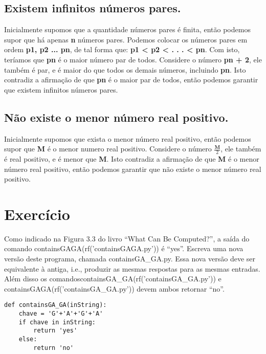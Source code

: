 \documentclass[12pt]{scrartcl}
\begin{document}
\subsection{ Existem infinitos números pares.}
Inicialmente supomos que a quantidade números pares é finita,
então podemos supor que há apenas \textbf{n} números pares.\newline
Podemos colocar os números pares em ordem \textbf{p1, p2 ... pn},
de tal forma que:\newline
\textbf{p1 < p2 < . . . < pn}. \newline
Com isto, teríamos que \textbf{pn} é o maior número par de todos.\newline
Considere o número \textbf{pn + 2}, ele também é par, e é
maior do que todos os demais números, incluindo \textbf{pn}. Isto contradiz a afirmação de que \textbf{pn}
 é o maior par de todos, então podemos garantir que existem infinitos números pares.
 
 
 \subsection{ Não existe o menor número real positivo.}
Inicialmente supomos que exista o menor número real positivo,
então podemos supor que  \textbf{M} é o menor numero real positivo.\newline
Considere o número $\displaystyle\frac{\textbf{M}}{2}$, ele também é real positivo, e é
menor que \textbf{M}. Isto contradiz a afirmação de que \textbf{M}
 é o menor número real positivo, então podemos garantir que não existe o menor número real positivo.








\section{Exercício}
Como indicado na Figura 3.3 do livro “What Can Be Computed?”, a saída do comando containsGAGA(rf('containsGAGA.py')) é “yes”.
Escreva uma nova versão deste programa, chamada containsGA\_GA.py. Essa nova versão deve ser equivalente à antiga,
i.e., produzir as mesmas respostas para as mesmas entradas. Além disso os comandoscontainsGA\_GA(rf('containsGA\_GA.py')) e containsGAGA(rf('containsGA\_GA.py'))
devem ambos retornar “no”.

\begin{verbatim}
def containsGA_GA(inString):
    chave = 'G'+'A'+'G'+'A'
    if chave in inString:
        return 'yes'
    else:
        return 'no'
\end{verbatim}
\end{document}
